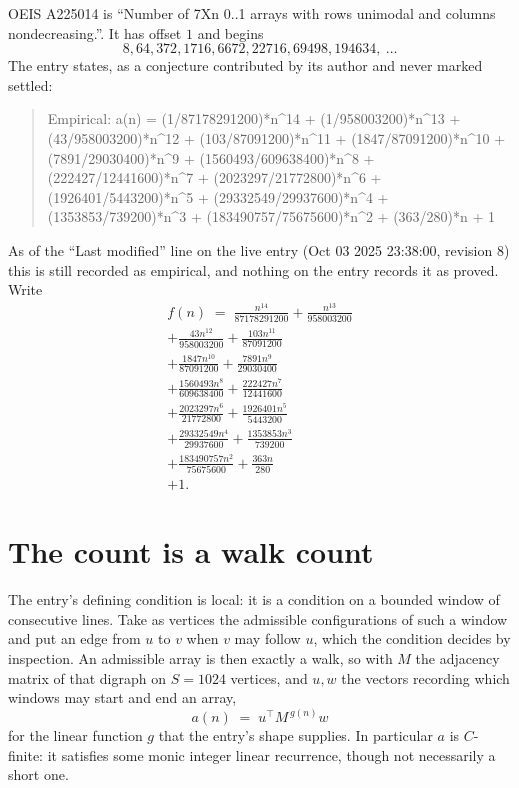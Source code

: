 \documentclass[11pt,a4paper]{article}
\theoremstyle{plain}
\theoremstyle{definition}
\begin{document}
OEIS A225014 is ``Number of 7Xn 0..1 arrays with rows unimodal and columns nondecreasing.''. It has offset $1$ and begins
\[
8, 64, 372, 1716, 6672, 22716, 69498, 194634,\ \dots
\]
The entry states, as a conjecture contributed by its author and never marked settled:
\begin{quote}
Empirical: a(n) = (1/87178291200)*n\^{}14 + (1/958003200)*n\^{}13 + (43/958003200)*n\^{}12 + (103/87091200)*n\^{}11 + (1847/87091200)*n\^{}10 + (7891/29030400)*n\^{}9 + (1560493/609638400)*n\^{}8 + (222427/12441600)*n\^{}7 + (2023297/21772800)*n\^{}6 + (1926401/5443200)*n\^{}5 + (29332549/29937600)*n\^{}4 + (1353853/739200)*n\^{}3 + (183490757/75675600)*n\^{}2 + (363/280)*n + 1
\end{quote}
As of the ``Last modified'' line on the live entry (Oct 03 2025 23:38:00, revision 8) this is still
recorded as empirical, and nothing on the entry records it as proved. Write
\begin{multline*}
f(n)\;=\;\frac{n^{14}}{87178291200} + \frac{n^{13}}{958003200} \\
+ \frac{43 n^{12}}{958003200} + \frac{103 n^{11}}{87091200} \\
+ \frac{1847 n^{10}}{87091200} + \frac{7891 n^{9}}{29030400} \\
+ \frac{1560493 n^{8}}{609638400} + \frac{222427 n^{7}}{12441600} \\
+ \frac{2023297 n^{6}}{21772800} + \frac{1926401 n^{5}}{5443200} \\
+ \frac{29332549 n^{4}}{29937600} + \frac{1353853 n^{3}}{739200} \\
+ \frac{183490757 n^{2}}{75675600} + \frac{363 n}{280} \\
+ 1.
\end{multline*}

\section{The count is a walk count}

The entry's defining condition is local: it is a condition on a bounded window of consecutive lines. Take as vertices the
admissible configurations of such a window and put an edge from $u$ to $v$ when $v$ may
follow $u$, which the condition decides by inspection. An admissible array is then exactly a
walk, so with $M$ the adjacency matrix of that digraph on $S=1024$ vertices, and $u,w$ the
vectors recording which windows may start and end an array,
\[
a(n)\;=\;u^{\!\top}M^{\,g(n)}w
\]
for the linear function $g$ that the entry's shape supplies. In particular $a$ is
$C$-finite: it satisfies some monic integer linear recurrence, though not necessarily a short
one.
\end{document}
